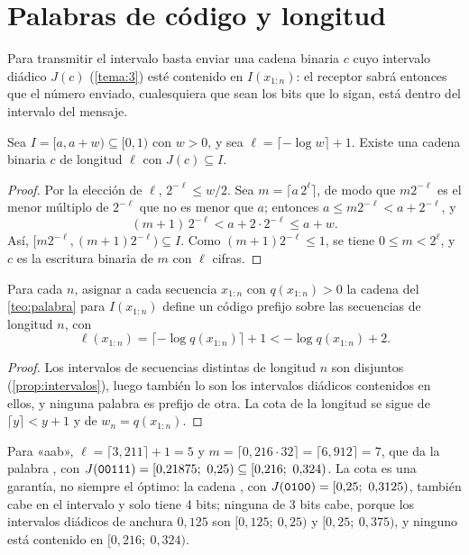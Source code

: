 \section{Palabras de código y longitud}

Para transmitir el intervalo basta enviar una cadena binaria $c$ cuyo intervalo diádico $J(c)$ (\cref{tema:3}) esté contenido en $I(x_{1:n})$: el receptor sabrá entonces que el número enviado, cualesquiera que sean los bits que lo sigan, está dentro del intervalo del mensaje.

\begin{teorema}\label{teo:palabra}
Sea $I=[a,a+w)\subseteq[0,1)$ con $w>0$, y sea $\ell=\lceil-\log w\rceil+1$. Existe una cadena binaria $c$ de longitud $\ell$ con $J(c)\subseteq I$.
\end{teorema}

\begin{proof}
Por la elección de $\ell$, $2^{-\ell}\le w/2$. Sea $m=\lceil a\,2^{\ell}\rceil$, de modo que $m2^{-\ell}$ es el menor múltiplo de $2^{-\ell}$ que no es menor que $a$; entonces $a\le m2^{-\ell}<a+2^{-\ell}$, y
\[
(m+1)\,2^{-\ell}<a+2\cdot2^{-\ell}\le a+w.
\]
Así, $[m2^{-\ell},(m+1)2^{-\ell})\subseteq I$. Como $(m+1)2^{-\ell}\le 1$, se tiene $0\le m<2^{\ell}$, y $c$ es la escritura binaria de $m$ con $\ell$ cifras.
\end{proof}

\begin{corolario}\label{cor:longitud}
Para cada $n$, asignar a cada secuencia $x_{1:n}$ con $q(x_{1:n})>0$ la cadena del \cref{teo:palabra} para $I(x_{1:n})$ define un código prefijo sobre las secuencias de longitud $n$, con
\[
\ell(x_{1:n})=\lceil-\log q(x_{1:n})\rceil+1<-\log q(x_{1:n})+2.
\]
\end{corolario}

\begin{proof}
Los intervalos de secuencias distintas de longitud $n$ son disjuntos (\cref{prop:intervalos}), luego también lo son los intervalos diádicos contenidos en ellos, y ninguna palabra es prefijo de otra. La cota de la longitud se sigue de $\lceil y\rceil<y+1$ y de $w_n=q(x_{1:n})$.
\end{proof}

\begin{ejemplo}\label{ej:aab-palabra}
Para «aab», $\ell=\lceil 3{,}211\rceil+1=5$ y $m=\lceil 0{,}216\cdot 32\rceil=\lceil 6{,}912\rceil=7$, que da la palabra , con $J(\bin{00111})=[0{,}21875;\ 0{,}25)\subseteq[0{,}216;\ 0{,}324)$. La cota es una garantía, no siempre el óptimo: la cadena , con $J(\textnormal{\texttt{0100}})=[0{,}25;\ 0{,}3125)$, también cabe en el intervalo y solo tiene 4 bits; ninguna de 3 bits cabe, porque los intervalos diádicos de anchura $0{,}125$ son $[0{,}125;\ 0{,}25)$ y $[0{,}25;\ 0{,}375)$, y ninguno está contenido en $[0{,}216;\ 0{,}324)$.
\end{ejemplo}

